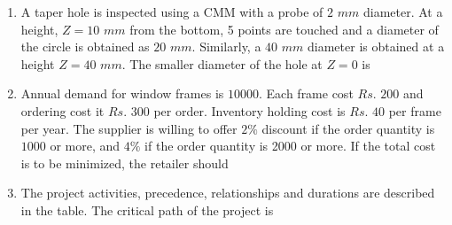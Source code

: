 \documentclass[journal,12pt,onecolumn]{IEEEtran}
\theoremstyle{remark}
\begin{document}
\begin{enumerate}
\item A taper hole is inspected using a CMM with a probe of $2$ $mm$ diameter. At a height, $Z=10$ $mm$ from the bottom, 5 points are touched and a diameter of the circle  is obtained as $20$ $mm$. Similarly, a $40$ $mm$ diameter is obtained at a height $Z=40$ $mm$. The smaller diameter  of the hole at $Z=0$ is
\\\begin{center}
   \scalebox{0.5}{}
\end{center}
\hfill{}
\begin{enumerate}
\end{enumerate}

\item Annual demand for window frames is $10000$. Each frame cost $Rs.$ $200$ and ordering cost it $Rs.$ $300$ per order. Inventory holding cost is $Rs.$ $40$ per frame per year. The supplier is willing to offer $2\%$ discount if the order quantity is $1000$ or more, and $4\%$ if the order quantity is 2000 or more. If the total cost is to be minimized, the retailer should

\hfill{}
\begin{enumerate}
\end{enumerate}

\item The project activities, precedence, relationships and durations are described in the table. The critical path of the project is\\
\\\begin{table}[h!]    
  \centering
  
\end{table}\\
\hfill{}
\begin{enumerate}
\end{enumerate}
\end{enumerate}
\end{document}
